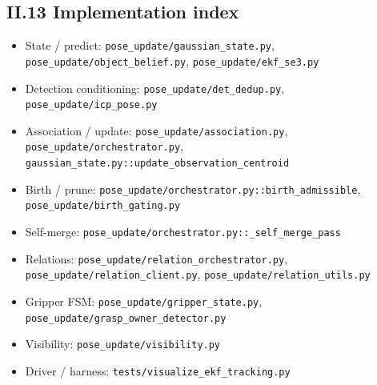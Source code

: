\documentclass[11pt]{article}
\newcommand{\file}[1]{\texttt{#1}}
\begin{document}
\subsection*{II.13 Implementation index}
\begin{itemize}
\item State / predict: \file{pose\_update/gaussian\_state.py}, \file{pose\_update/object\_belief.py}, \file{pose\_update/ekf\_se3.py}
\item Detection conditioning: \file{pose\_update/det\_dedup.py}, \file{pose\_update/icp\_pose.py}
\item Association / update: \file{pose\_update/association.py}, \file{pose\_update/orchestrator.py}, \file{gaussian\_state.py::update\_observation\_centroid}
\item Birth / prune: \file{pose\_update/orchestrator.py::birth\_admissible}, \file{pose\_update/birth\_gating.py}
\item Self-merge: \file{pose\_update/orchestrator.py::\_self\_merge\_pass}
\item Relations: \file{pose\_update/relation\_orchestrator.py}, \file{pose\_update/relation\_client.py}, \file{pose\_update/relation\_utils.py}
\item Gripper FSM: \file{pose\_update/gripper\_state.py}, \file{pose\_update/grasp\_owner\_detector.py}
\item Visibility: \file{pose\_update/visibility.py}
\item Driver / harness: \file{tests/visualize\_ekf\_tracking.py}
\end{itemize}
\end{document}
